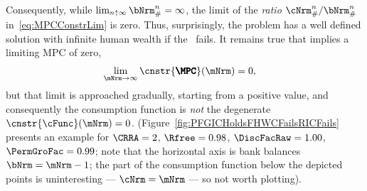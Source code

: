 \documentclass[\econtexRoot/BufferStockTheory]{subfiles}
\begin{document}
Consequently, while $\lim_{n \uparrow \infty} \bNrm_{\#}^{n} = \infty$, the limit of the \textit{ratio} $\cNrm_{\#}^{n}/\bNrm_{\#}^{n}$ in~\eqref{eq:MPCConstrLim} is zero.
Thus, surprisingly, the problem has a well defined solution with
infinite human wealth if the \RIC~fails.  It remains true that \cncl{\RIC}
implies a limiting MPC of zero,
\begin{equation}\begin{gathered}\begin{aligned}
  \lim_{\mNrm \rightarrow \infty} \cnstr{\pmb{\MPC}}(\mNrm)   & = 0,
\end{aligned}\end{gathered}\end{equation}
but that limit is approached gradually, starting from a positive value, and consequently the consumption function is \textit{not} the degenerate $\cnstr{\cFunc}(\mNrm)=0$.  (Figure~\ref{fig:PFGICHoldsFHWCFailsRICFails} presents an example for $\CRRA=2$, $\Rfree=0.98$, $\DiscFacRaw = 1.00$, $\PermGroFac = 0.99$; note that the horizontal axis is bank balances $\bNrm = \mNrm-1$; the part of the consumption function below the depicted points is uninteresting --- $\cNrm = \mNrm$ --- so not worth plotting).



\end{document}
